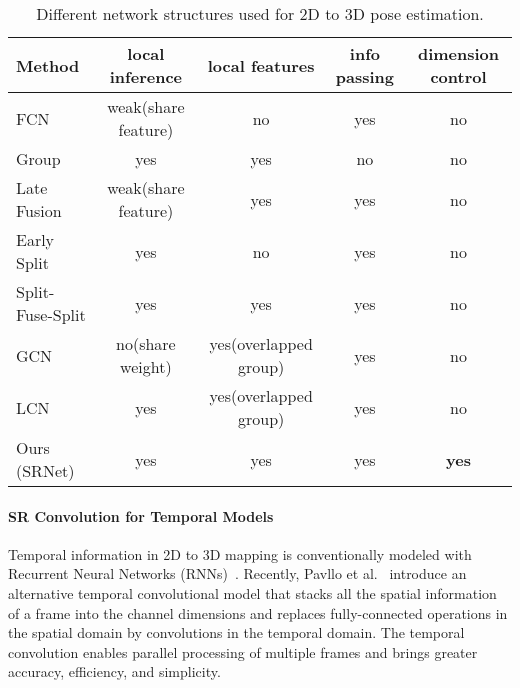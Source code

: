 \documentclass[runningheads]{llncs}
\begin{document}
\begin{table}
{
\scriptsize{
\begin{center}
\begin{tabular}{ l |c|c|c|c}
\hline
Method      & local inference & local features & info passing & dimension control\\
\hline
FCN         & weak(share feature) & no  & yes & no  \\
Group       & yes & yes & no  & no  \\
\hline
Late Fusion~\cite{park20183d} & weak(share feature) & yes & yes & no  \\
Early Split & yes & no  & yes & no  \\
Split-Fuse-Split & yes & yes & yes & no  \\
\hline
GCN~\cite{zhao2019semantic}  & no(share weight)  & yes(overlapped group) & yes & no  \\
LCN~\cite{ci2019optimizing}  & yes & yes(overlapped group)  & yes & no  \\
\hline
Ours (SRNet) & yes & yes & yes & \textbf{yes} \\
\hline
\end{tabular}
\end{center}
}
}
\caption{Different network structures used for 2D to 3D pose estimation.}
\label{tab:Summary}
\end{table}














\paragraph{\textbf{SR Convolution for Temporal Models}} Temporal information in 2D to 3D mapping is conventionally modeled with Recurrent Neural Networks (RNNs)~\cite{cai2019exploiting,lee2018propagating}. Recently, Pavllo et al.~\cite{pavllo20193d} introduce an alternative temporal convolutional model that stacks all the spatial information of a frame into the channel dimensions and replaces fully-connected operations in the spatial domain by convolutions in the temporal domain. The temporal convolution enables parallel processing of multiple frames and brings greater accuracy, efficiency, and simplicity.
\end{document}
